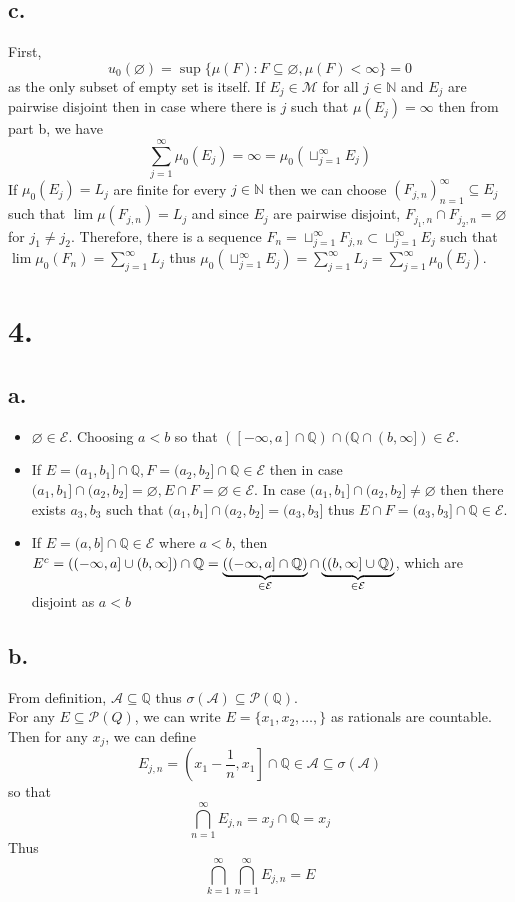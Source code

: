 \documentclass[11pt]{article}
\theoremstyle{mystyle}
\theoremstyle{definition}
\begin{document}
\subsection*{c.}
First, 
\[
  u_0(\varnothing) = \sup \{\mu(F): F \subseteq \varnothing, \mu(F) < \infty \} = 0 
\]
as the only subset of empty set is itself. If $E_j \in \mathcal{M}$ for all $j \in \mathbb{N}$ and $E_j$ are pairwise disjoint then in case where there is $j$ such that $\mu(E_j) = \infty$ then from part b, we have  
\[
  \sum_{j=1}^\infty \mu_0(E_j) = \infty = \mu_0(\sqcup_{j=1}^\infty E_j)
\]
If $\mu_0(E_j) = L_j$ are finite for every $j \in \mathbb{N}$ then we can choose $(F_{j,n})_{n=1}^\infty \subseteq E_j$ such that $\lim \mu(F_{j,n}) = L_j$ and since $E_j$ are pairwise disjoint, $F_{j_1, n} \cap F_{j_2, n} = \varnothing$ for $j_1 \ne j_2$. Therefore, there is a sequence $F_n = \sqcup_{j=1}^\infty F_{j,n} \subset \sqcup_{j=1}^\infty E_j$ such that $\lim \mu_0(F_n) = \sum_{j=1}^\infty L_j$ thus $\mu_0(\sqcup_{j=1}^\infty E_j) = \sum_{j=1}^\infty L_j = \sum_{j=1}^\infty \mu_0(E_j)$.  
\newpage
\section*{4.}
\subsection*{a.}
\begin{itemize}
  \item $\varnothing \in \mathcal{E}$. Choosing $a< b$ so that $([-\infty , a] \cap \mathbb{Q}) \cap (\mathbb{Q} \cap (b, \infty]) \in \mathcal{E}$. 
  \item If $E = (a_1, b_1] \cap \mathbb{Q}, F = (a_2, b_2] \cap \mathbb{Q} \in \mathcal{E}$ then in case $(a_1, b_1] \cap (a_2, b_2] = \varnothing, E \cap F = \varnothing \in \mathcal{E}$. In case $(a_1, b_1] \cap (a_2, b_2] \ne \varnothing$ then there exists $a_3, b_3$ such that $(a_1, b_1] \cap (a_2, b_2] = (a_3, b_3]$ thus $E \cap F = (a_3, b_3] \cap \mathbb{Q} \in \mathcal{E}$.
  \item If $E = (a, b] \cap \mathbb{Q} \in \mathcal{E}$ where $a<b$, then $E^c = ((-\infty, a] \cup (b, \infty]) \cap \mathbb{Q}\\ = \underbrace{((-\infty, a] \cap \mathbb{Q})}_{\in \mathcal{E}} \cap \underbrace{((b, \infty] \cup \mathbb{Q})}_{\in \mathcal{E}}$, which are disjoint as $a<b$
\end{itemize}
\subsection*{b.}
From definition, $\mathcal{A} \subseteq \mathbb{Q}$ thus $\sigma(\mathcal{A}) \subseteq \mathcal{P}(\mathbb{Q})$. \\
For any $E \subseteq \mathcal{P}(Q)$, we can write $E = \{x_1, x_2, \hdots, \}$ as rationals are countable. Then for any $x_j$, we can define  
\[ 
  E_{j,n} = \left(x_1 - \displaystyle\frac{1}{n}, x_1 \right]\cap \mathbb{Q} \in \mathcal{A} \subseteq \sigma(\mathcal{A})
\]
so that 
\[
  \bigcap_{n=1}^\infty E_{j,n} = x_j \cap \mathbb{Q} = x_j 
\]
Thus 
\[
  \bigcap_{k=1}^\infty \bigcap_{n=1}^\infty E_{j,n} = E
\]
\end{document}
